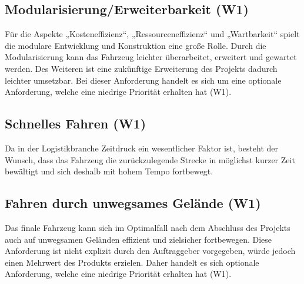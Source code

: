 \subsection*{Modularisierung/Erweiterbarkeit (W1)}
Für die Aspekte „Kosteneffizienz“, „Ressourceneffizienz“ und „Wartbarkeit“ spielt die modulare Entwicklung und Konstruktion eine große Rolle. Durch die Modularisierung kann das Fahrzeug leichter überarbeitet, erweitert und gewartet werden. Des Weiteren ist eine zukünftige Erweiterung des Projekts dadurch leichter umsetzbar. Bei dieser Anforderung handelt es sich um eine optionale Anforderung, welche eine niedrige Priorität erhalten hat (W1).

\subsection*{Schnelles Fahren (W1)}
Da in der Logistikbranche Zeitdruck ein wesentlicher Faktor ist, besteht der Wunsch, dass das Fahrzeug die zurückzulegende Strecke in möglichst kurzer Zeit bewältigt und sich deshalb mit hohem Tempo fortbewegt.

\subsection*{Fahren durch unwegsames Gelände (W1)}
Das finale Fahrzeug kann sich im Optimalfall nach dem Abschluss des Projekts auch auf unwegsamen Geländen effizient und zielsicher fortbewegen. Diese Anforderung ist nicht explizit durch den Auftraggeber vorgegeben, würde jedoch einen Mehrwert des Produkts erzielen. Daher handelt es sich optionale Anforderung, welche eine niedrige Priorität erhalten hat (W1).
